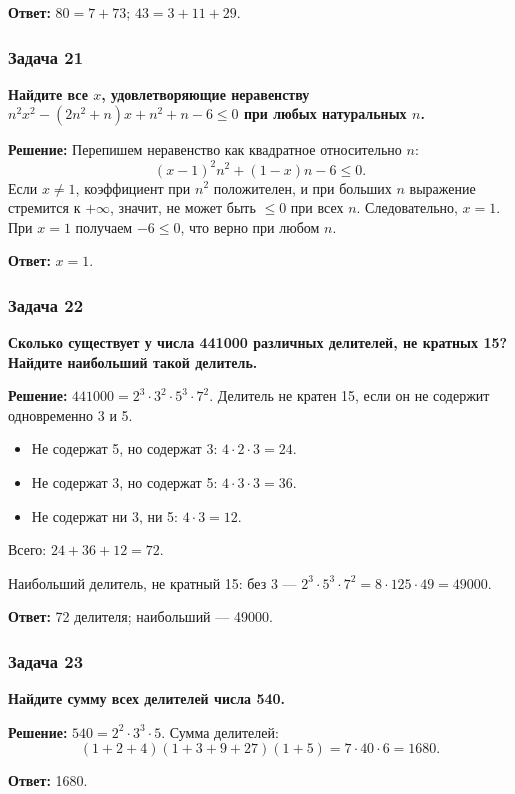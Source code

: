 \documentclass[12pt, a4paper]{article}
\begin{document}
\textbf{Ответ:} $80 = 7 + 73$; $43 = 3 + 11 + 29$.

\subsubsection*{Задача 21}
\textbf{Найдите все $x$, удовлетворяющие неравенству $n^2x^2 - (2n^2+n)x + n^2 + n - 6 \le 0$ при любых натуральных $n$.}

\textbf{Решение:}
Перепишем неравенство как квадратное относительно $n$:
\[
(x-1)^2 n^2 + (1-x)n - 6 \le 0.
\]
Если $x \neq 1$, коэффициент при $n^2$ положителен, и при больших $n$ выражение стремится к $+\infty$, значит, не может быть $\le 0$ при всех $n$. Следовательно, $x = 1$. При $x = 1$ получаем $-6 \le 0$, что верно при любом $n$.

\textbf{Ответ:} $x = 1$.

\subsubsection*{Задача 22}
\textbf{Сколько существует у числа 441000 различных делителей, не кратных 15? Найдите наибольший такой делитель.}

\textbf{Решение:}
$441000 = 2^3 \cdot 3^2 \cdot 5^3 \cdot 7^2$. Делитель не кратен 15, если он не содержит одновременно 3 и 5.

\begin{itemize}
    \item Не содержат 5, но содержат 3: $4 \cdot 2 \cdot 3 = 24$.
    \item Не содержат 3, но содержат 5: $4 \cdot 3 \cdot 3 = 36$.
    \item Не содержат ни 3, ни 5: $4 \cdot 3 = 12$.
\end{itemize}
Всего: $24 + 36 + 12 = 72$.

Наибольший делитель, не кратный 15: без 3 — $2^3 \cdot 5^3 \cdot 7^2 = 8 \cdot 125 \cdot 49 = 49000$.

\textbf{Ответ:} 72 делителя; наибольший — 49000.

\subsubsection*{Задача 23}
\textbf{Найдите сумму всех делителей числа 540.}

\textbf{Решение:}
$540 = 2^2 \cdot 3^3 \cdot 5$. Сумма делителей:
\[
(1+2+4)(1+3+9+27)(1+5) = 7 \cdot 40 \cdot 6 = 1680.
\]

\textbf{Ответ:} 1680.
\end{document}
